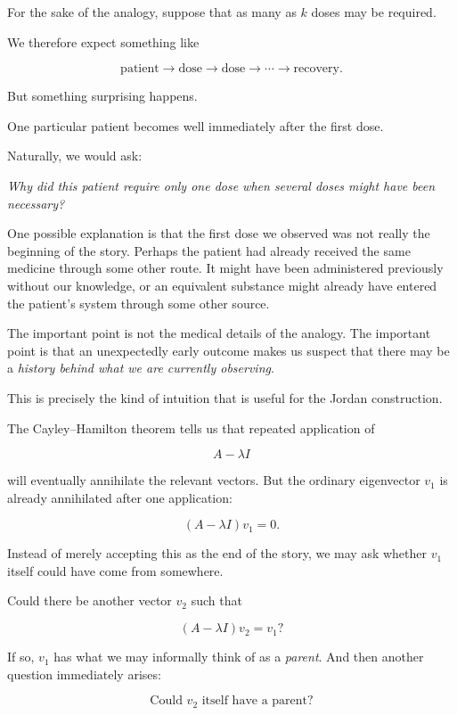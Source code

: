\documentclass[11pt]{article}
\begin{document}
For the sake of the analogy, suppose that as many as \(k\) doses may
be required.

We therefore expect something like

\[
\text{patient}
\longrightarrow
\text{dose}
\longrightarrow
\text{dose}
\longrightarrow
\cdots
\longrightarrow
\text{recovery}.
\]

But something surprising happens.

One particular patient becomes well immediately after the first dose.

Naturally, we would ask:

\begin{center}
\emph{Why did this patient require only one dose when several doses
might have been necessary?}
\end{center}

One possible explanation is that the first dose we observed was not
really the beginning of the story.  Perhaps the patient had already
received the same medicine through some other route.  It might have
been administered previously without our knowledge, or an equivalent
substance might already have entered the patient's system through some
other source.

The important point is not the medical details of the analogy.  The
important point is that an unexpectedly early outcome makes us suspect
that there may be a \emph{history behind what we are currently
observing}.

This is precisely the kind of intuition that is useful for the Jordan
construction.

The Cayley--Hamilton theorem tells us that repeated application of

\[
A-\lambda I
\]

will eventually annihilate the relevant vectors.  But the ordinary
eigenvector \(v_1\) is already annihilated after one application:

\[
(A-\lambda I)v_1=0.
\]

Instead of merely accepting this as the end of the story, we may ask
whether \(v_1\) itself could have come from somewhere.

Could there be another vector \(v_2\) such that

\[
(A-\lambda I)v_2=v_1?
\]

If so, \(v_1\) has what we may informally think of as a
\emph{parent}.  And then another question immediately arises:

\[
\text{Could }v_2\text{ itself have a parent?}
\]
\end{document}
